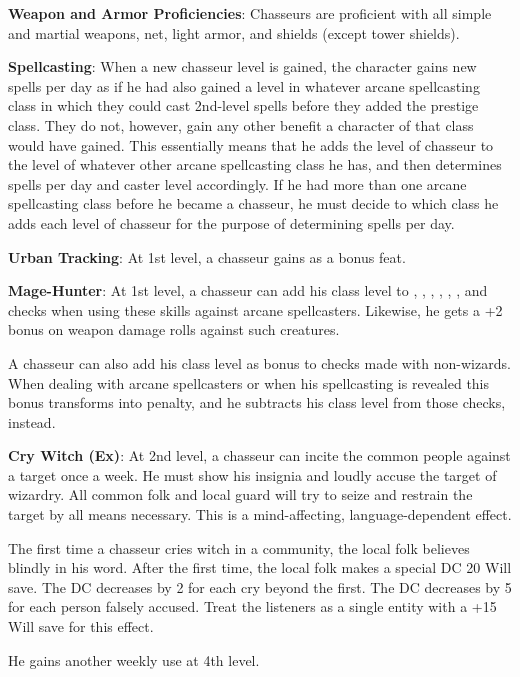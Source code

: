 {
\textbf{Weapon and Armor Proficiencies}: Chasseurs are proficient with all simple and martial weapons, net, light armor, and shields (except tower shields).

\textbf{Spellcasting}: When a new chasseur level is gained, the character gains new spells per day as if he had also gained a level in whatever arcane spellcasting class in which they could cast 2nd-level spells before they added the prestige class. They do not, however, gain any other benefit a character of that class would have gained. This essentially means that he adds the level of chasseur to the level of whatever other arcane spellcasting class he has, and then determines spells per day and caster level accordingly. If he had more than one arcane spellcasting class before he became a chasseur, he must decide to which class he adds each level of chasseur for the purpose of determining spells per day.

\textbf{Urban Tracking}: At 1st level, a chasseur gains  as a bonus feat.

\textbf{Mage-Hunter}: At 1st level, a chasseur can add his class level to , , , , , , and  checks when using these skills against arcane spellcasters. Likewise, he gets a +2 bonus on weapon damage rolls against such creatures.

A chasseur can also add his class level as bonus to  checks made with non-wizards. When dealing with arcane spellcasters or when his spellcasting is revealed this bonus transforms into penalty, and he subtracts his class level from those checks, instead.

\textbf{Cry Witch (Ex)}: At 2nd level, a chasseur can incite the common people against a target once a week. He must show his insignia and loudly accuse the target of wizardry. All common folk and local guard will try to seize and restrain the target by all means necessary. This is a mind-affecting, language-dependent effect.

The first time a chasseur cries witch in a community, the local folk believes blindly in his word. After the first time, the local folk makes a special DC 20 Will save. The DC decreases by 2 for each cry beyond the first. The DC decreases by 5 for each person falsely accused. Treat the listeners as a single entity with a +15 Will save for this effect.

He gains another weekly use at 4th level.


}
